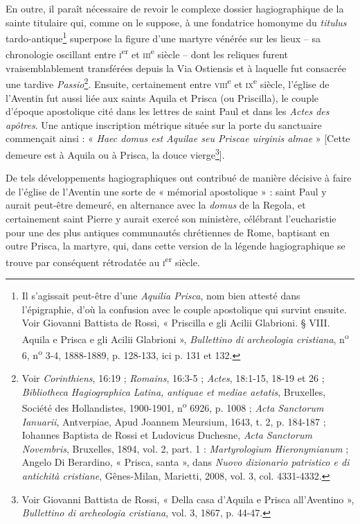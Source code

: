 \documentclass[12pt,twoside,openany]{book}
\begin{document}
En outre, il paraît nécessaire de revoir le complexe dossier hagiographique de la sainte titulaire qui, comme on le suppose, à une fondatrice homonyme du \textit{titulus} tardo-antique\footnote{Il s’agissait peut-être d’une \textit{Aquilia Prisca}, nom bien attesté dans l’épigraphie, d’où la confusion avec le couple apostolique qui survint ensuite. Voir Giovanni Battista de Rossi, « Priscilla e gli Acilii Glabrioni. § VIII. Aquila e Prisca e gli Acilii Glabrioni », \textit{Bullettino di archeologia cristiana}, n\textsuperscript{o} 6, n\textsuperscript{o} 3-4, 1888-1889, p. 128-133, ici p. 131 et 132.} superpose la figure d’une martyre vénérée sur les lieux – sa chronologie oscillant entre \textsc{i}\textsuperscript{er} et \textsc{iii}\textsuperscript{e} siècle – dont les reliques furent vraisemblablement transférées depuis la Via Ostiensis et à laquelle fut consacrée une tardive\textit{ Passio}\footnote{Voir \textit{Corinthiens}, 16:19 ; \textit{Romains}, 16:3-5 ; \textit{Actes}, 18:1-15, 18-19 et 26 ; \textit{Bibliotheca Hagiographica Latina, antiquae et mediae aetatis}, Bruxelles, Société des Hollandistes, 1900-1901, n\textsuperscript{o} 6926, p. 1008 ;\textit{ Acta Sanctorum Ianuarii}, Antverpiae, Apud Joannem Meursium, 1643, t. 2, p. 184-187 ; Iohannes Baptista de Rossi et Ludovicus Duchesne, \textit{Acta Sanctorum Novembris}, Bruxelles, 1894, vol. 2, part. 1 : \textit{Martyrologium Hieronymianum} ; Angelo Di Berardino, « Prisca, santa », dans \textit{Nuovo dizionario patristico e di antichità cristiane}, Gênes-Milan, Marietti, 2008, vol. 3, col. 4331-4332.}. Ensuite, certainement entre \textsc{viii}\textsuperscript{e} et \textsc{ix}\textsuperscript{e} siècle, l’église de l’Aventin fut aussi liée aux saints Aquila et Prisca (ou Priscilla), le couple d’époque apostolique cité dans les lettres de saint Paul et dans les \textit{Actes des apôtres}. Une antique inscription métrique située sur la porte du sanctuaire commençait ainsi : « \textit{Haec domus est Aquilae seu Priscae uirginis almae} » [Cette demeure est à Aquila ou à Prisca, la douce vierge\footnote{Voir Giovanni Battista de Rossi, « Della casa d’Aquila e Prisca all’Aventino », \textit{Bullettino di archeologia cristiana}, vol. 3, 1867, p. 44-47.}].

De tels développements hagiographiques ont contribué de manière décisive à faire de l’église de l’Aventin une sorte de « mémorial apostolique » : saint Paul y aurait peut-être demeuré, en alternance avec la \textit{domus} de la Regola, et certainement saint Pierre y aurait exercé son ministère, célébrant l’eucharistie pour une des plus antiques communautés chrétiennes de Rome, baptisant en outre Prisca, la martyre, qui, dans cette version de la légende hagiographique se trouve par conséquent rétrodatée au \textsc{i}\textsuperscript{er} siècle.
\end{document}
